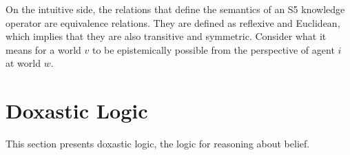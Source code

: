 On the intuitive side, the relations that define the semantics of an S5 knowledge operator are equivalence relations. They are defined as reflexive and Euclidean, which implies that they are also transitive and symmetric. Consider what it means for a world $v$ to be epistemically possible from the perspective of agent $i$ at world $w$.
\section{Doxastic Logic}
This section presents doxastic logic, the logic for reasoning about belief.




